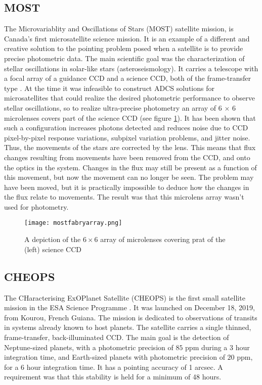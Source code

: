 \documentclass[../main.tex]{subfiles}
\begin{document}
\subsection{MOST}
The Microvariablity and Oscillations of Stars (MOST) satellite mission, is Canada's first microsatellite science mission\cite{mostdescription}. It is an example of a different and creative solution to the pointing problem posed when a satellite is to provide precise photometric data. 
The main scientific goal was the characterization of stellar oscillations in solar-like stars (asteroseismology). It carries a telescope with a focal array of a guidance CCD and a science CCD, both of the frame-transfer type \cite{mostdescription}. 
At the time it was infeasible to construct ADCS solutions for microsatellites that could realize the desired photometric performance to observe stellar oscillations\cite{mostdescription}, so to realize ultra-precise photometry an array of 6 $\times$ 6  microlenses covers part of the science CCD (see figure \ref{fig:mostfabryarray}). It has been shown that such a configuration increases photons detected and reduces noise due to CCD pixel-by-pixel response variations, subpixel variation problems, and jitter noise. Thus, the movements of the stars are corrected by the lens. 
This means that flux changes resulting from movements have been removed from the CCD, and onto the optics in the system. Changes in the flux may still be present as a function of this movement, but now the movement can no longer be seen. The problem may have been moved, but it is practically impossible to deduce how the changes in the flux relate to movements. The result was that this microlens array wasn't used for photometry.

\begin{figure}
	\centering
	\texttt{[image: mostfabryarray.png]}
	\caption{A depiction of the $6\times 6$ array of microlenses covering prat of the (left) science CCD \cite{mostdescription}}
	\label{fig:mostfabryarray}
\end{figure}

\subsection{CHEOPS}
The CHaracterising ExOPlanet Satellite (CHEOPS) is the first small satellite mission in the ESA Science Programme \cite{cheopsmission}. It was launched on December 18, 2019, from Kourou, French Guiana. The mission is dedicated to observations of transits in systems already known to host planets\cite{cheopsmission}. The satellite carries a single thinned, frame-transfer, back-illuminated CCD. The main goal is the detection of Neptune-sized planets, with a photometric precision of $85$ ppm during a $3$ hour integration time, and Earth-sized planets with photometric precision of $20$ ppm, for a 6 hour integration time. It has a pointing accuracy of 1 arcsec. A requirement was that this stability is held for a minimum of 48 hours. 
\end{document}
